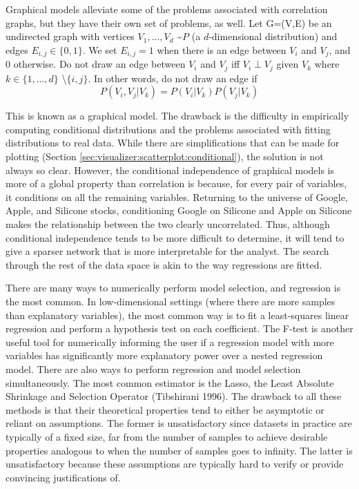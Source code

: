 Graphical models alleviate some of the problems associated with correlation graphs, but they have their own set of problems, as well. Let G=(V,E) be an undirected graph with vertices $V_1,...,V_d$ \textasciitilde $P$ (a $d$-dimensional distribution) and edges $E_{i,j}\in\{0,1\}$. We set $E_{i,j}=1$ when there is an edge between $V_i$ and $V_j$, and 0 otherwise. Do not draw an edge between $V_i$ and $V_j$ iff $V_i \perp V_j$ given $V_k$ where $k\in\{1,...,d\}$ \textbackslash $\{i,j\}$. In other words, do not draw an edge if
$$P(V_i,V_j|V_k)=P(V_i|V_k)P(V_j|V_k)$$

This is known as a graphical model. The drawback is the difficulty in empirically computing conditional distributions and the problems associated with fitting distributions to real data. While there are simplifications that can be made for plotting (Section \ref{sec:visualizer:scatterplot:conditional}), the solution is not always so clear. However, the conditional independence of graphical models is more of a global property than correlation is because, for every pair of variables, it conditions on all the remaining variables. Returning to the universe of Google, Apple, and Silicone stocks, conditioning Google on Silicone and Apple on Silicone makes the relationship between the two clearly uncorrelated. Thus, although conditional independence tends to be more difficult to determine, it will tend to give a sparser network that is more interpretable for the analyst. The search through the rest of the data space is akin to the way regressions are fitted.

There are many ways to numerically perform model selection, and regression is the most common. In low-dimensional settings (where there are more samples than explanatory variables), the most common way is to fit a least-squares linear regression and perform a hypothesis test on each coefficient. The F-test is another useful tool for numerically informing the user if a regression model with more variables has significantly more explanatory power over a nested regression model. There are also ways to perform regression and model selection simultaneously. The most common estimator is the Lasso, the Least Absolute Shrinkage and Selection Operator (Tibshirani 1996). The drawback to all these methods is that their theoretical properties tend to either be asymptotic or reliant on assumptions. The former is unsatisfactory since datasets in practice are typically of a fixed size, far from the number of samples to achieve desirable properties analogous to when the number of samples goes to infinity. The latter is unsatisfactory because these assumptions are typically hard to verify or provide convincing justifications of.

